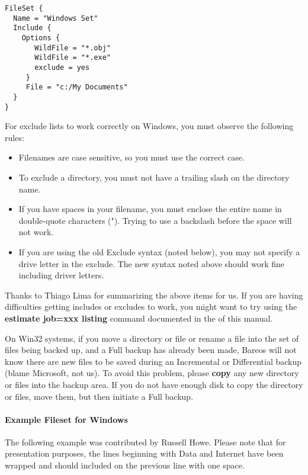 \footnotesize
\begin{verbatim}
FileSet {
  Name = "Windows Set"
  Include {
    Options {
       WildFile = "*.obj"
       WildFile = "*.exe"
       exclude = yes
     }
     File = "c:/My Documents"
  }
}
\end{verbatim}
\normalsize

For exclude lists to work correctly on Windows, you must observe the following
rules:

\begin{itemize}
\item Filenames are case sensitive, so you must use the correct case.
\item To exclude a directory, you must not have a trailing slash on the
   directory name.
\item If you have spaces in your filename, you must enclose the entire name
   in double-quote characters ("). Trying to use a backslash before  the space
   will not work.
\item If you are using the old Exclude syntax (noted below), you may not
   specify a drive letter in the exclude.  The new syntax noted above
   should work fine including driver letters.
\end{itemize}

Thanks to Thiago Lima for summarizing the above items for us. If you are
having difficulties getting includes or excludes to work, you might want to
try using the {\bf estimate job=xxx listing} command documented in the
 of this manual.

On Win32 systems, if you move a directory or file or rename a file into the
set of files being backed up, and a Full backup has already been made, Bareos
will not know there are new files to be saved during an Incremental or
Differential backup (blame Microsoft, not us). To avoid this problem, please
{\bf copy} any new directory or files into the backup area. If you do not have
enough disk to copy the directory or files, move them, but then initiate a
Full backup.


\paragraph*{Example Fileset for Windows}


The following example was contributed by Russell Howe. Please note that
for presentation purposes, the lines beginning with Data and Internet
have been wrapped and should included on the previous line with one
space.

